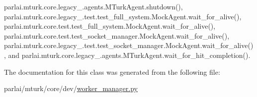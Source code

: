 parlai.\+mturk.\+core.\+legacy\+\_.\+agents.\+M\+Turk\+Agent.\+shutdown(), parlai.\+mturk.\+core.\+legacy\+\_.\+test.\+test\+\_\+full\+\_\+system.\+Mock\+Agent.\+wait\+\_\+for\+\_\+alive(), parlai.\+mturk.\+core.\+test.\+test\+\_\+full\+\_\+system.\+Mock\+Agent.\+wait\+\_\+for\+\_\+alive(), parlai.\+mturk.\+core.\+test.\+test\+\_\+socket\+\_\+manager.\+Mock\+Agent.\+wait\+\_\+for\+\_\+alive(), parlai.\+mturk.\+core.\+legacy\+\_.\+test.\+test\+\_\+socket\+\_\+manager.\+Mock\+Agent.\+wait\+\_\+for\+\_\+alive(), and parlai.\+mturk.\+core.\+legacy\+\_.\+agents.\+M\+Turk\+Agent.\+wait\+\_\+for\+\_\+hit\+\_\+completion().



The documentation for this class was generated from the following file\+:\begin{DoxyCompactItemize}
\item 
parlai/mturk/core/dev/\hyperlink{dev_2worker__manager_8py}{worker\+\_\+manager.\+py}\end{DoxyCompactItemize}
